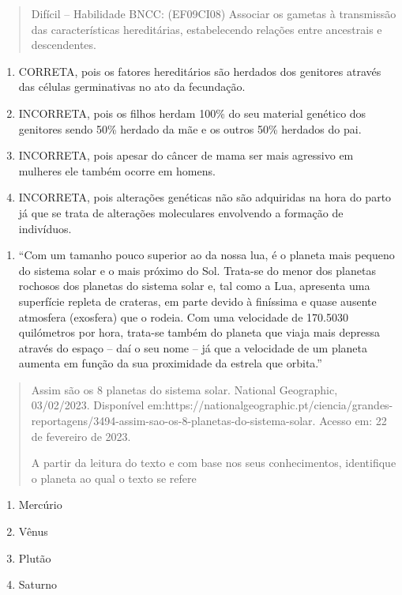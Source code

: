\begin{quote}
Difícil -- Habilidade BNCC: (EF09CI08) Associar os gametas à transmissão
das características hereditárias, estabelecendo relações entre
ancestrais e descendentes.
\end{quote}

\begin{enumerate}
\def\labelenumi{(\Alph{enumi})}
\item
  CORRETA, pois os fatores hereditários são herdados dos genitores
  através das células germinativas no ato da fecundação.
\item
  INCORRETA, pois os filhos herdam 100\% do seu material genético dos
  genitores sendo 50\% herdado da mãe e os outros 50\% herdados do pai.
\item
  INCORRETA, pois apesar do câncer de mama ser mais agressivo em
  mulheres ele também ocorre em homens.
\item
  INCORRETA, pois alterações genéticas não são adquiridas na hora do
  parto já que se trata de alterações moleculares envolvendo a formação
  de indivíduos.
\end{enumerate}

\begin{enumerate}
\def\labelenumi{\arabic{enumi})}
\item
  ``Com um tamanho pouco superior ao da nossa lua, é o planeta mais
  pequeno do sistema solar e o mais próximo do Sol. Trata-se do menor
  dos planetas rochosos dos planetas do sistema solar e, tal como a Lua,
  apresenta uma superfície repleta de crateras, em parte devido à
  finíssima e quase ausente atmosfera (exosfera) que o rodeia. Com uma
  velocidade de 170.5030 quilómetros por hora, trata-se também do
  planeta que viaja mais depressa através do espaço -- daí o seu nome --
  já que a velocidade de um planeta aumenta em função da sua proximidade
  da estrela que orbita.''
\end{enumerate}

\begin{quote}
Assim são os 8 planetas do sistema solar. National Geographic,
03/02/2023. Disponível
em:https://nationalgeographic.pt/ciencia/grandes-reportagens/3494-assim-sao-os-8-planetas-do-sistema-solar.
Acesso em: 22 de fevereiro de 2023.

A partir da leitura do texto e com base nos seus conhecimentos,
identifique o planeta ao qual o texto se refere
\end{quote}

\begin{enumerate}
\def\labelenumi{(\Alph{enumi})}
\item
  Mercúrio
\item
  Vênus
\item
  Plutão
\item
  Saturno
\end{enumerate}

